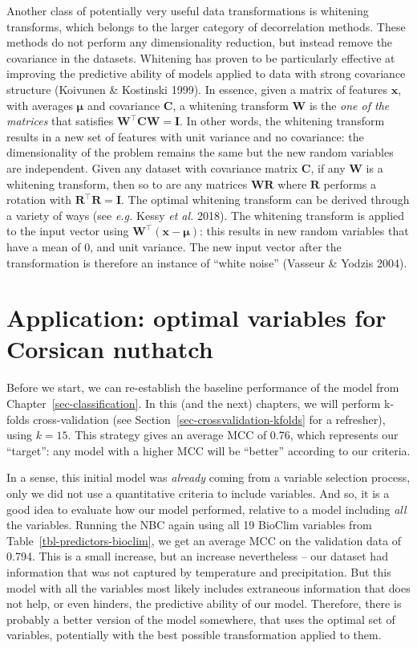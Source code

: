 \documentclass[
  letterpaper,
]{scrbook}
\begin{document}
Another class of potentially very useful data transformations is
whitening transforms, which belongs to the larger category of
decorrelation methods. These methods do not perform any dimensionality
reduction, but instead remove the covariance in the datasets. Whitening
has proven to be particularly effective at improving the predictive
ability of models applied to data with strong covariance structure
(Koivunen \& Kostinski 1999). In essence, given a matrix of features
\(\mathbf{x}\), with averages \(\mathbf{\mu}\) and covariance
\(\mathbf{C}\), a whitening transform \(\mathbf{W}\) is the \emph{one of
the matrices} that satisfies
\(\mathbf{W}^\top\mathbf{C}\mathbf{W} = \mathbf{I}\). In other words,
the whitening transform results in a new set of features with unit
variance and no covariance: the dimensionality of the problem remains
the same but the new random variables are independent. Given any dataset
with covariance matrix \(\mathbf{C}\), if any \(\mathbf{W}\) is a
whitening transform, then so to are any matrices
\(\mathbf{W}\mathbf{R}\) where \(\mathbf{R}\) performs a rotation with
\(\mathbf{R}^\top\mathbf{R} = \mathbf{I}\). The optimal whitening
transform can be derived through a variety of ways (see \emph{e.g.}
Kessy \emph{et al.} 2018). The whitening transform is applied to the
input vector using \(\mathbf{W}^\top (\mathbf{x}-\mathbf{\mu})\): this
results in new random variables that have a mean of 0, and unit
variance. The new input vector after the transformation is therefore an
instance of ``white noise'' (Vasseur \& Yodzis 2004).

\section{Application: optimal variables for Corsican
nuthatch}\label{application-optimal-variables-for-corsican-nuthatch}

Before we start, we can re-establish the baseline performance of the
model from Chapter~\ref{sec-classification}. In this (and the next)
chapters, we will perform k-folds cross-validation (see
Section~\ref{sec-crossvalidation-kfolds} for a refresher), using
\(k=15\). This strategy gives an average MCC of 0.76, which represents
our ``target'': any model with a higher MCC will be ``better'' according
to our criteria.

In a sense, this initial model was \emph{already} coming from a variable
selection process, only we did not use a quantitative criteria to
include variables. And so, it is a good idea to evaluate how our model
performed, relative to a model including \emph{all} the variables.
Running the NBC again using all 19 BioClim variables from
Table~\ref{tbl-predictors-bioclim}, we get an average MCC on the
validation data of 0.794. This is a small increase, but an increase
nevertheless -- our dataset had information that was not captured by
temperature and precipitation. But this model with all the variables
most likely includes extraneous information that does not help, or even
hinders, the predictive ability of our model. Therefore, there is
probably a better version of the model somewhere, that uses the optimal
set of variables, potentially with the best possible transformation
applied to them.
\end{document}
